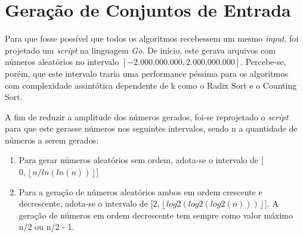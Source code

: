 \documentclass[
	12pt,				%
	openany,
	a4paper,			%
	english,			%
	french,				%
	spanish,			%
	brazil,				%
	]{abntex2}
\begin{document}

\frenchspacing 



\imprimircapa

\imprimirfolhaderosto*



\listoftables*
\clearpage

\tableofcontents*
\textual


\chapter{Geração de Conjuntos de Entrada}
    Para que fosse possível que todos os algoritmos recebessem um mesmo \textit{input}, foi projetado um \textit{script} na linguagem \textit{Go}. De início, este gerava arquivos com números aleatórios no intervalo $[-2.000.000.000, 2.000.000.000]$. Percebe-se, porém, que este intervalo traria uma performance péssima para os algoritmos com complexidade assintótica dependente de k como o Radix Sort e o Counting Sort.
    
    A fim de reduzir a amplitude dos números gerados, foi-se reprojetado o \textit{script} para que este gerasse números nos seguintes intervalos, sendo n a quantidade de números a serem gerados:
    \begin{enumerate}
	    \item Para gerar números aleatórios sem ordem, adota-se o intervalo de [$0, \left \lfloor{n/ln(ln(n))}\right \rfloor $]
	    \item Para a geração de números aleatórios ambos em ordem crescente e decrescente, adota-se o intervalo de [$2, \left \lfloor{log2(log2(log2(n)))}\right \rfloor $]. A geração de números em ordem decrescente tem sempre como valor máximo n/2  ou n/2 - 1.
\end{enumerate}
\end{document}
